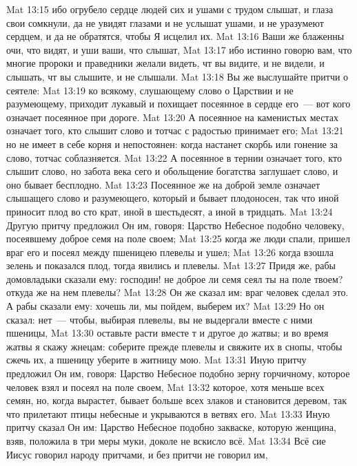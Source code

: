 \vs Mat 13:15 ибо огрубело сердце людей сих и ушами с трудом слышат, и глаза свои сомкнули, да не увидят глазами и не услышат ушами, и не уразумеют сердцем, и да не обратятся, чтобы Я исцелил их.
\vs Mat 13:16 Ваши же блаженны очи, что видят, и уши ваши, что слышат,
\vs Mat 13:17 ибо истинно говорю вам, что многие пророки и праведники желали видеть, чт вы видите, и не видели, и слышать, чт вы слышите, и не слышали.
\vs Mat 13:18 Вы же выслушайте  притчи о сеятеле:
\vs Mat 13:19 ко всякому, слушающему слово о Царствии и не разумеющему, приходит лукавый и похищает посеянное в сердце его~--- вот кого означает посеянное при дороге.
\vs Mat 13:20 А посеянное на каменистых местах означает того, кто слышит слово и тотчас с радостью принимает его;
\vs Mat 13:21 но не имеет в себе корня и непостоянен: когда настанет скорбь или гонение за слово, тотчас соблазняется.
\vs Mat 13:22 А посеянное в тернии означает того, кто слышит слово, но забота века сего и обольщение богатства заглушает слово, и оно бывает бесплодно.
\vs Mat 13:23 Посеянное же на доброй земле означает слышащего слово и разумеющего, который и бывает плодоносен, так что иной приносит плод во сто крат, иной в шестьдесят, а иной в тридцать.
\rsbpar\vs Mat 13:24 Другую притчу предложил Он им, говоря: Царство Небесное подобно человеку, посеявшему доброе семя на поле своем;
\vs Mat 13:25 когда же люди спали, пришел враг его и посеял между пшеницею плевелы и ушел;
\vs Mat 13:26 когда взошла зелень и показался плод, тогда явились и плевелы.
\vs Mat 13:27 Придя же, рабы домовладыки сказали ему: господин! не доброе ли семя сеял ты на поле твоем? откуда же на нем плевелы?
\vs Mat 13:28 Он же сказал им: враг человек сделал это. А рабы сказали ему: хочешь ли, мы пойдем, выберем их?
\vs Mat 13:29 Но он сказал: нет~--- чтобы, выбирая плевелы, вы не выдергали вместе с ними пшеницы,
\vs Mat 13:30 оставьте расти вместе т и другое до жатвы; и во время жатвы я скажу жнецам: соберите прежде плевелы и свяжите их в снопы, чтобы сжечь их, а пшеницу уберите в житницу мою.
\rsbpar\vs Mat 13:31 Иную притчу предложил Он им, говоря: Царство Небесное подобно зерну горчичному, которое человек взял и посеял на поле своем,
\vs Mat 13:32 которое, хотя меньше всех семян, но, когда вырастет, бывает больше всех злаков и становится деревом, так что прилетают птицы небесные и укрываются в ветвях его.
\rsbpar\vs Mat 13:33 Иную притчу сказал Он им: Царство Небесное подобно закваске, которую женщина, взяв, положила в три меры муки, доколе не вскисло всё.
\rsbpar\vs Mat 13:34 Всё сие Иисус говорил народу притчами, и без притчи не говорил им,

